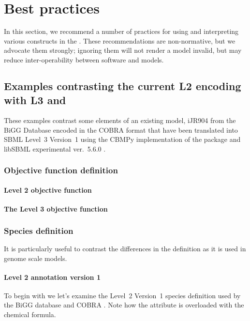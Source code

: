 
\section{Best practices}
\label{best-practices}

In this section, we recommend a number of practices for using and
interpreting various constructs in the \FBCPackage.
These recommendations are non-normative, but we advocate them strongly;
ignoring them will not render a model invalid, but may reduce
inter-operability between software and models.

\subsection{Examples contrasting the current \SBML L2 encoding with L3 and \FBC}
These examples contrast some elements of an existing model, iJR904 from the \textsf{BiGG} Database encoded in the \textsf{COBRA} format \cite{ijr904, bigg, cobra} that have been translated into SBML Level~3 Version~1 using the \textsf{CBMPy} implementation of the \FBC package \cite{pysces, cbmpy} and \textsf{libSBML} experimental ver.~5.6.0 \cite{libsbml}.

\subsubsection*{Objective function definition}
\paragraph{\SBML Level 2 objective function}

\paragraph{The \SBML Level 3 objective function}
\protect{}

\subsubsection*{Species definition}
It is particularly useful to contrast the differences in the \Species definition as it is used in genome scale models.

\paragraph{\SBML Level 2 \Species annotation version 1}
To begin with we let's examine the \SBML Level~2 Version~1 species definition used by the BiGG database and \textsf{COBRA} \cite{bigg, cobra}. Note how the  attribute is overloaded with the chemical formula.
%

